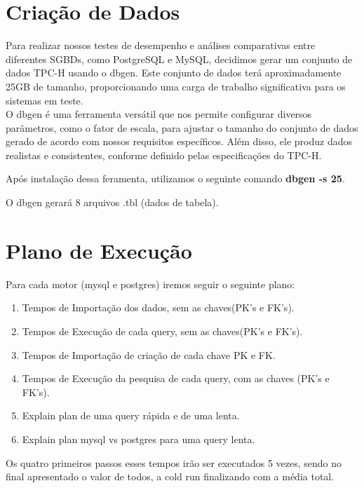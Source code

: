 \documentclass{article}
\begin{document}
\section{Criação de Dados}

\quad Para realizar nossos testes de desempenho e análises comparativas entre diferentes SGBDs, como PostgreSQL e MySQL, decidimos gerar um conjunto de dados TPC-H usando o dbgen. Este conjunto de dados terá aproximadamente 25GB de tamanho, proporcionando uma carga de trabalho significativa para os sistemas em teste.\\

\quad O dbgen é uma ferramenta versátil que nos permite configurar diversos parâmetros, como o fator de escala, para ajustar o tamanho do conjunto de dados gerado de acordo com nossos requisitos específicos. Além disso, ele produz dados realistas e consistentes, conforme definido pelas especificações do TPC-H.


\quad Após instalação dessa feramenta, utilizamos o seguinte comando \textbf{dbgen -s 25}.

\quad O dbgen gerará 8 arquivos .tbl (dados de tabela).




\section{Plano de Execução}


\quad Para cada motor (mysql e postgres) iremos seguir o seguinte plano:

\begin{enumerate}
    \item Tempos de Importação dos dados, sem as chaves(PK's e FK's).
    \item Tempos de Execução de cada query, sem as chaves(PK's e FK's).
    \item Tempos de Importação de criação de cada chave PK e FK.
    \item Tempos de Execução da pesquisa de cada query, com as chaves (PK's e FK's).
    \item Explain plan de uma query rápida e de uma lenta.
    \item Explain plan mysql vs postgres para uma query lenta.
\end{enumerate}

\quad Os quatro primeiros passos esses tempos irão ser executados 5 vezes, sendo no final apresentado o valor de todos, a cold run finalizando com a média total.\\
\end{document}
